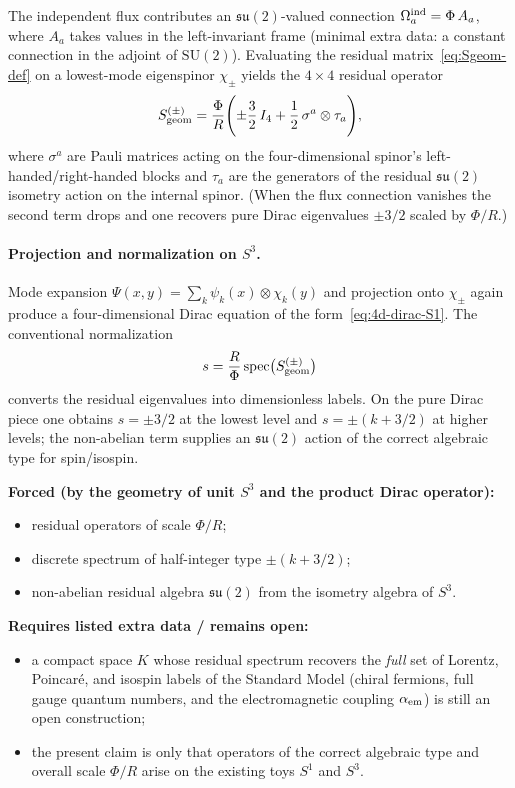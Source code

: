 \documentclass[11pt,a4paper]{article}
\begin{document}
The independent flux contributes an \(\mathfrak{su}(2)\)-valued connection \(\Omega_a^{\rm ind}=\Phi\,A_a\), where \(A_a\) takes values in the left-invariant frame (minimal extra data: a constant connection in the adjoint of \(\mathrm{SU}(2)\)). Evaluating the residual matrix~\eqref{eq:Sgeom-def} on a lowest-mode eigenspinor \(\chi_\pm\) yields the \(4\times4\) residual operator
\begin{equation}
S_{\rm geom}^{(\pm)}
=\frac{\Phi}{R}\Biggl(\pm\frac32\,I_4
+\frac12\,\sigma^a\otimes\tau_a\Biggr),
\label{eq:Sgeom-S3}
\end{equation}
where \(\sigma^a\) are Pauli matrices acting on the four-dimensional spinor’s left-handed/right-handed blocks and \(\tau_a\) are the generators of the residual \(\mathfrak{su}(2)\) isometry action on the internal spinor. (When the flux connection vanishes the second term drops and one recovers pure Dirac eigenvalues \(\pm3/2\) scaled by \(\Phi/R\).)

\paragraph{Projection and normalization on \(S^3\).}
Mode expansion \(\Psi(x,y)=\sum_k\psi_k(x)\otimes\chi_k(y)\) and projection onto \(\chi_\pm\) again produce a four-dimensional Dirac equation of the form~\eqref{eq:4d-dirac-S1}. The conventional normalization
\begin{equation}
s=\frac{R}{\Phi}\,\mathrm{spec}\bigl(S_{\rm geom}^{(\pm)}\bigr)
\label{eq:spin-norm-S3}
\end{equation}
converts the residual eigenvalues into dimensionless labels. On the pure Dirac piece one obtains \(s=\pm3/2\) at the lowest level and \(s=\pm(k+3/2)\) at higher levels; the non-abelian term supplies an \(\mathfrak{su}(2)\) action of the correct algebraic type for spin/isospin.

\textbf{Forced (by the geometry of unit \(S^3\) and the product Dirac operator):}
\begin{itemize}[leftmargin=*]
\item residual operators of scale \(\Phi/R\);
\item discrete spectrum of half-integer type \(\pm(k+3/2)\);
\item non-abelian residual algebra \(\mathfrak{su}(2)\) from the isometry algebra of \(S^3\).
\end{itemize}
\textbf{Requires listed extra data / remains open:}
\begin{itemize}[leftmargin=*]
\item a compact space \(K\) whose residual spectrum recovers the \emph{full} set of Lorentz, Poincar\'e, and isospin labels of the Standard Model (chiral fermions, full gauge quantum numbers, and the electromagnetic coupling \(\alpha_{\rm em}\)) is still an open construction;
\item the present claim is only that operators of the correct algebraic type and overall scale \(\Phi/R\) arise on the existing toys \(S^1\) and \(S^3\).
\end{itemize}
\end{document}
